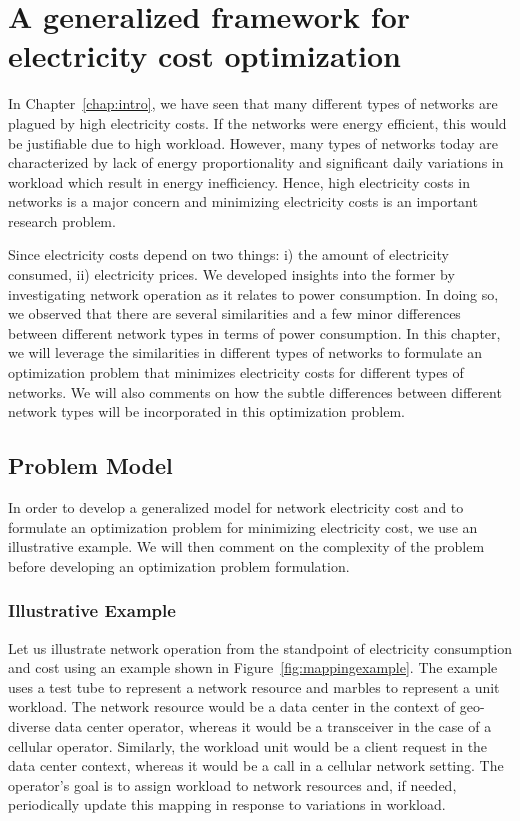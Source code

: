 \chapter{A generalized framework for electricity cost optimization}
\label{chap:framework} In Chapter~\ref{chap:intro}, we have seen that many different types of networks are plagued by high electricity costs. If the networks were energy efficient, this would be justifiable due to high workload. However, many types of networks today are characterized by lack of energy proportionality and significant daily variations in workload which result in energy inefficiency. Hence, high electricity costs in networks is a major concern and minimizing electricity costs is an important research problem.  

Since electricity costs depend on two things: i) the amount of electricity consumed, ii) electricity prices. We developed insights into the former by investigating network operation as it relates to power consumption. In doing so, we observed that there are several similarities and a few minor differences between different network types in terms of power consumption. In this chapter, we will leverage the similarities in different types of networks to formulate an optimization problem that minimizes electricity costs for different types of networks. We will also comments on how the subtle differences between different network types will be incorporated in this optimization problem.


\section{Problem Model} %
In order to develop a generalized model for network electricity cost and to formulate an optimization problem for minimizing electricity cost, we use an illustrative example. We will then comment on the complexity of the problem before developing an optimization problem formulation.

\subsection{Illustrative Example}
\label{subsec:framework:example}
Let us illustrate network operation from the standpoint of electricity consumption and cost using an example shown in Figure~\ref{fig:mappingexample}. The example uses a test tube to represent a network resource and marbles to represent a unit workload. The network resource would be a data center in the context of geo-diverse data center operator, whereas it would be a transceiver in the case of a cellular operator. Similarly, the workload unit would be a client request in the data center context, whereas it would be a call in a cellular network setting. The operator's goal is to assign workload to network resources and, if needed, periodically update this mapping in response to variations in workload.

